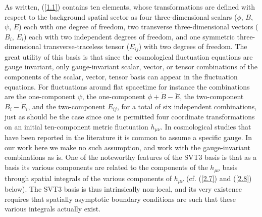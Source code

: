 \documentclass[aps,onecolumn,10pt]{revtex4}
\numberwithin{equation}{section}
\numberwithin{equation}{section}
\begin{document}
As written, (\ref{1.1}) contains ten elements, whose transformations are defined with respect to the background spatial sector as four three-dimensional scalars ($\phi$, $B$, $\psi$, $E$) each with one degree of freedom, two transverse three-dimensional vectors ($B_i$, $E_i$) each with two independent degrees of freedom, and one symmetric three-dimensional transverse-traceless tensor ($E_{ij}$) with two degrees of freedom. The great utility of this basis is that since the cosmological fluctuation equations are gauge invariant, only gauge-invariant scalar, vector, or tensor combinations of the components of the scalar, vector, tensor basis can appear in the fluctuation equations. For fluctuations around flat spacetime for instance the combinations are the one-component $\psi$, the one-component $\phi+\dot{B}  -\ddot{E}$, the two-component $B_{i} -  \dot{E}_{i}$, and the two-component $E_{ij}$, for a total of six independent combinations, just as should be the case since one is permitted four coordinate transformations on an initial ten-component metric fluctuation $h_{\mu\nu}$. In cosmological studies that have been reported in the literature it is common to assume a specific gauge. In our work here we make no such assumption, and work with the gauge-invariant combinations as is. One of the noteworthy features of the SVT3 basis is that as a basis its various components are related to the components of the $h_{\mu\nu}$ basis through spatial integrals of the various components of $h_{\mu\nu}$ (cf. (\ref{2.7}) and (\ref{2.8}) below). The SVT3 basis is thus intrinsically non-local, and its very existence requires that spatially asymptotic boundary conditions are such that these various integrals actually exist. 
\end{document}
